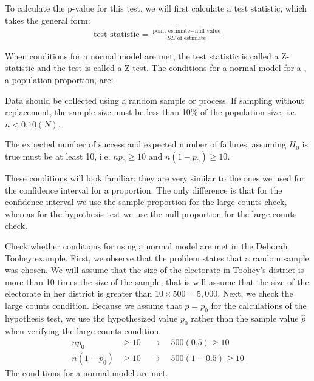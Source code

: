 To calculate the p-value for this test, we will first calculate a test statistic, which takes the general form:
\begin{align*}
\text{test statistic} = \frac{\text{point estimate} - \text{null value}}{SE \text{ of estimate}}
\end{align*}

When conditions for a normal model are met, the test statistic is called a Z-statistic and the test is called a Z-test.  The conditions for a normal model for a , a population proportion, are:
\begin{description}
\setlength{\itemsep}{0mm}
\item[Independence.] Data should be collected using a random sample or process.  If sampling without replacement, the sample size must be less than 10\% of the population size, i.e. $n < 0.10(N)$.  
\item[Large counts.] The expected number of success and expected number of failures, assuming $H_0$ is true must be at least 10, i.e. $np_0 \ge 10$ and $n(1-p_0) \ge 10$. 
\end{description}


These conditions will look familiar: they are very similar to the ones we used for the confidence interval for a proportion.  The only difference is that for the confidence interval we use the sample proportion for the large counts check, whereas for the hypothesis test we use the null proportion for the large counts check.  

\begin{examplewrap}
\begin{nexample}{Check whether conditions for using a normal model are met in the Deborah Toohey example.}
First, we observe that the problem states that a random sample was chosen.  We will assume that the size of the electorate in Toohey's district is more than 10 times the size of the sample, that is will assume that the size of the electorate in her district is greater than $10\times 500=5,000$.  Next, we check the large counts condition.    Because we assume that $p = p_0$ for the calculations of the hypothesis test, we use the hypothesized value $p_0$ rather than the sample value $\hat{p}$ when verifying the large counts condition.  
\begin{align*}
np_0 &\geq 10 \quad \rightarrow \quad 500(0.5) \geq 10 \\
n(1-p_0) &\geq 10 \quad \rightarrow \quad 500(1-0.5) \geq 10
\end{align*}
The conditions for a normal model are met.
\end{nexample}
\end{examplewrap}

